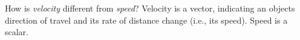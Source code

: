 {How is \textit{velocity} different from \textit{speed}?
}
{
Velocity is a vector, indicating an objects direction of travel and its rate of distance change (i.e., its speed). Speed is a scalar.
}

